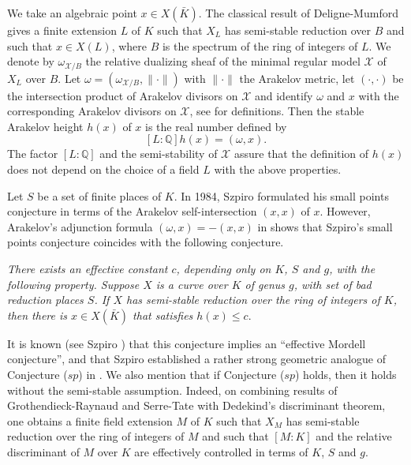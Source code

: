 \documentclass[11pt]{article}
\numberwithin{equation}{section}
\newcommand {\Q} {{\mathbb Q}}
\newcommand {\QQ}  {{\mathbb Q}}
\newcommand {\cc} {sp}
\newcommand {\p} {x}
\begin{document}
We take an algebraic point $\p\in X(\bar{K})$. 
The classical result of Deligne-Mumford gives a finite extension $L$ of $K$ such that $X_L$ has semi-stable reduction over $B$ and such that $\p\in X(L)$, where $B$ is the spectrum of the ring of integers of $L$.  
We denote by $\omega_{\mathcal X/B}$ the relative dualizing sheaf of the minimal regular model $\mathcal X$ of $X_L$ over $B$.  Let $\omega=(\omega_{\mathcal X/B}, \lVert \cdot \rVert)$  with $\lVert \cdot \rVert$ the Arakelov metric, let $(\cdot ,\cdot)$ be the intersection product of Arakelov divisors on $\mathcal X$ and identify $\omega$ and $\p$  with the corresponding Arakelov divisors on $\mathcal X$, see \cite[Section 2]{faltings:arithmeticsurfaces} for definitions. 
Then the stable Arakelov height $h(\p)$ of $\p$ is the real number defined by
\begin{equation}\label{def:h}
[L:\Q]h(\p)=(\omega,\p).
\end{equation} 
The factor $[L:\QQ]$ and the semi-stability of $\mathcal X$ assure that the definition of $h(x)$ does not depend on the choice of a field  $L$ with the above properties. 

Let $S$ be a set of finite places of $K$. In 1984, Szpiro \cite[p.101]{szpiro:faltings} formulated his small points conjecture in terms of the Arakelov self-intersection $(\p,\p)$ of $x$. However, Arakelov's  adjunction formula  $(\omega,\p)=-(\p,\p)$ in \cite{arakelov:intersectiontheory}
shows that Szpiro's small points conjecture coincides with the following conjecture. 

\vspace{0.3cm}
\noindent{\bf Conjecture $(\cc)$.}
\emph{There exists an effective constant $c$, depending only on $K$, $S$ and $g$, with the following property. Suppose $X$ is a curve over $K$ of genus $g$,  with set of bad reduction places $S$. If $X$ has  semi-stable reduction over  the ring of integers of $K$, then there is $\p\in X(\bar{K})$ that satisfies $h(\p)\leq c.$
\vspace{0.3cm}}

It is known (see Szpiro \cite[p.101]{szpiro:faltings})  that this conjecture implies an ``effective Mordell conjecture'', and that Szpiro established a rather strong geometric analogue of Conjecture ($\cc$)  in \cite{szpiro:seminaire81}. 
We also mention that if Conjecture ($\cc$) holds, then it holds without the semi-stable assumption.  Indeed, on combining results of Grothendieck-Raynaud \cite[Proposition 4.7]{grra:neronmodels} and Serre-Tate \cite[Theorem 1]{seta:goodreduction} with Dedekind's discriminant theorem, one obtains a finite field extension $M$ of $K$ such that $X_M$ has semi-stable reduction over the ring of integers of $M$ and such that $[M:K]$ and the relative discriminant of $M$ over $K$ are effectively controlled in terms of $K$, $S$ and $g$. 
\end{document}
